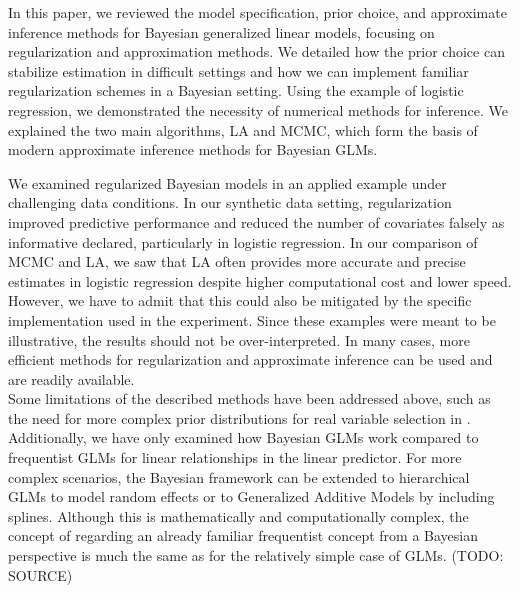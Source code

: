 In this paper, we reviewed the model specification, prior choice, and approximate inference methods for Bayesian generalized linear models, focusing on regularization and approximation methods.
We detailed how the prior choice can stabilize estimation in difficult settings and how we can implement familiar regularization schemes in a Bayesian setting.
Using the example of logistic regression, we demonstrated the necessity of numerical methods for inference.
We explained the two main algorithms, LA and MCMC, which form the basis of modern approximate inference methods for Bayesian GLMs.

We examined regularized Bayesian models in an applied example under challenging data conditions.
In our synthetic data setting, regularization improved predictive performance and reduced the number of covariates falsely as informative declared, particularly in logistic regression.
In our comparison of MCMC and LA, we saw that LA often provides more accurate and precise estimates in logistic regression despite higher computational cost and lower speed.
However, we have to admit that this could also be mitigated by the specific implementation used in the experiment.
Since these examples were meant to be illustrative, the results should not be over-interpreted.
In many cases, more efficient methods for regularization and approximate inference can be used and are readily available.\\

Some limitations of the described methods have been addressed above, such as the need for more complex prior distributions for real variable selection in .
Additionally, we have only examined how Bayesian GLMs work compared to frequentist GLMs for linear relationships in the linear predictor.
For more complex scenarios, the Bayesian framework can be extended to hierarchical GLMs to model random effects or to Generalized Additive Models by including splines.
Although this is mathematically and computationally complex, the concept of regarding an already familiar frequentist concept from a Bayesian perspective is much the same as for the relatively simple case of GLMs. (TODO: SOURCE)
